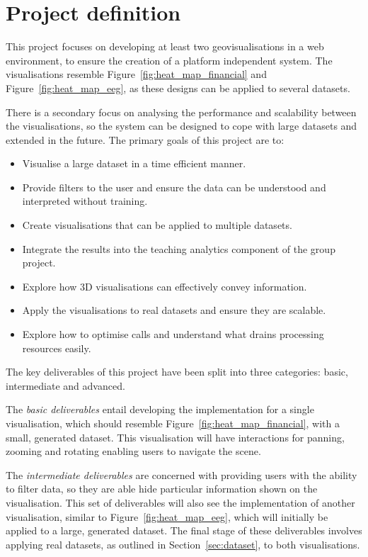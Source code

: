 \section{Project definition} {
\label{sec:project_definition}

	This project focuses on developing at least two geovisualisations in a web environment, to ensure the creation of a platform independent system. The visualisations resemble Figure~\ref{fig:heat_map_financial} and Figure~\ref{fig:heat_map_eeg}, as these designs can be applied to several datasets.

	

	There is a secondary focus on analysing the performance and scalability between the visualisations, so the system can be designed to cope with large datasets and extended in the future. The primary goals of this project are to:

	\begin{itemize}
		\item Visualise a large dataset in a time efficient manner.
		\item Provide filters to the user and ensure the data can be understood and interpreted without training.
		\item Create visualisations that can be applied to multiple datasets.
		\item Integrate the results into the teaching analytics component of the group project.
		\item Explore how 3D visualisations can effectively convey information.
		\item Apply the visualisations to real datasets and ensure they are scalable.
		\item Explore how to optimise calls and understand what drains processing resources easily.
	\end{itemize}

	The key deliverables of this project have been split into three categories: basic, intermediate and advanced.

	The \emph{basic deliverables} entail developing the implementation for a single visualisation, which should resemble Figure~\ref{fig:heat_map_financial}, with a small, generated dataset. This visualisation will have interactions for panning, zooming and rotating enabling users to navigate the scene.

	The \emph{intermediate deliverables} are concerned with providing users with the ability to filter data, so they are able hide particular information shown on the visualisation. This set of deliverables will also see the implementation of another visualisation, similar to Figure~\ref{fig:heat_map_eeg}, which will initially be applied to a large, generated dataset. The final stage of these deliverables involves applying real datasets, as outlined in Section~\ref{sec:dataset}, to both visualisations.

}
